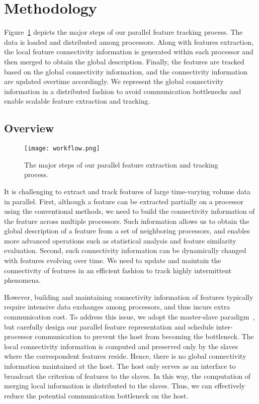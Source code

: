 \section{Methodology}

Figure~\ref{fig:workflow} depicts the major steps of our parallel feature tracking process. The data is loaded and distributed among processors. Along with features extraction, the local feature connectivity information is generated within each processor and then merged to obtain the global description. Finally, the features are tracked based on the global connectivity information, and the connectivity information are updated overtime accordingly. We represent the global connectivity information in a distributed fashion to avoid communication bottlenecks and enable scalable feature extraction and tracking.

\subsection{Overview}

\begin{figure}[t]
\centering
\texttt{[image: workflow.png]}
\caption{The major steps of our parallel feature extraction and tracking process.}
\label{fig:workflow}
\end{figure}

It is challenging to extract and track features of large time-varying volume data in parallel. First, although a feature can be extracted partially on a processor using the conventional methods, we need to build the connectivity information of the feature across multiple processors. Such information allows us to obtain the global description of a feature from a set of neighboring processors, and enables more advanced operations such as statistical analysis and feature similarity evaluation. Second, such connectivity information can be dynamically changed with features evolving over time. We need to update and maintain the connectivity of features in an efficient fashion to track highly intermittent phenomena.

However, building and maintaining connectivity information of features typically require intensive data exchanges among processors, and thus incurs extra communication cost. To address this issue, we adopt the master-slave paradigm~\cite{Chen03realtime}, but carefully design our parallel feature representation and schedule inter-processor communication to prevent the host from becoming the bottleneck. The local connectivity information is computed and preserved only by the slaves where the correspondent features reside. Hence, there is no global connectivity information maintained at the host. The host only serves as an interface to broadcast the criterion of features to the slaves. In this way, the computation of merging local information is distributed to the slaves. Thus, we can effectively reduce the potential communication bottleneck on the host.

